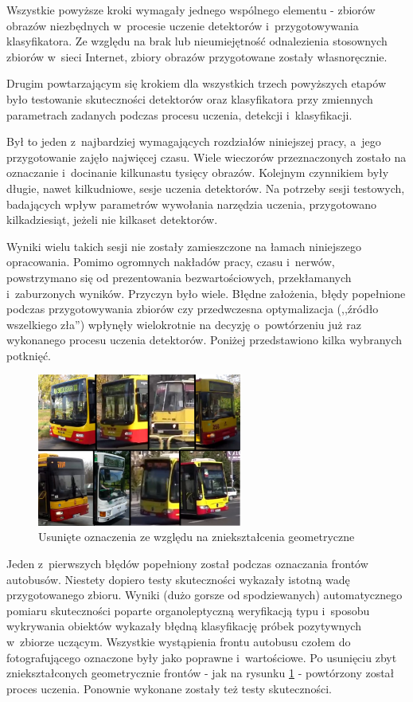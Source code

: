 Wszystkie powyższe kroki wymagały jednego wspólnego elementu - zbiorów obrazów
niezbędnych w~procesie uczenie detektorów i~przygotowywania klasyfikatora.
Ze względu na brak lub nieumiejętność odnalezienia stosownych zbiorów
w~sieci Internet, zbiory obrazów przygotowane zostały własnoręcznie.

Drugim powtarzającym się krokiem dla wszystkich trzech powyższych etapów było
testowanie skuteczności detektorów oraz klasyfikatora przy zmiennych
parametrach zadanych podczas procesu uczenia, detekcji i~klasyfikacji.

Był to jeden z~najbardziej wymagających rozdziałów niniejszej pracy, a~jego
przygotowanie zajęło najwięcej czasu. Wiele wieczorów przeznaczonych zostało 
na oznaczanie i~docinanie kilkunastu tysięcy obrazów. Kolejnym czynnikiem były długie,
nawet kilkudniowe, sesje uczenia detektorów. Na potrzeby sesji testowych,
badających wpływ parametrów wywołania narzędzia uczenia, przygotowano
kilkadziesiąt, jeżeli nie kilkaset detektorów.

Wyniki wielu takich sesji nie zostały zamieszczone na łamach niniejszego opracowania.
Pomimo ogromnych nakładów pracy, czasu i~nerwów, powstrzymano się
od prezentowania bezwartościowych, przekłamanych i~zaburzonych wyników.
Przyczyn było wiele.
Błędne założenia, błędy popełnione podczas przygotowywania zbiorów czy 
przedwczesna optymalizacja (,,źródło wszelkiego zła'') wpłynęły wielokrotnie
na decyzję o~powtórzeniu już raz wykonanego procesu uczenia detektorów.
Poniżej przedstawiono kilka wybranych 
potknięć.

\begin{figure}[h!]
	\centering
	\includegraphics[width=0.6\textwidth]{img/exp_removed_distorted_fronts}
	\caption{Usunięte oznaczenia ze względu na zniekształcenia geometryczne}
	\label{fig:deformation_samples}
\end{figure}

Jeden z~pierwszych błędów popełniony został podczas oznaczania
frontów autobusów. Niestety dopiero testy skuteczności wykazały
istotną wadę przygotowanego zbioru. Wyniki (dużo gorsze od spodziewanych)
automatycznego pomiaru skuteczności poparte organoleptyczną weryfikacją 
typu i~sposobu wykrywania obiektów wykazały błędną klasyfikację próbek pozytywnych
w~zbiorze uczącym. Wszystkie wystąpienia frontu autobusu czołem do fotografującego
oznaczone były jako poprawne i~wartościowe. Po usunięciu zbyt
zniekształconych geometrycznie frontów - jak na rysunku \ref{fig:deformation_samples} -
powtórzony został proces uczenia. Ponownie wykonane zostały też testy skuteczności.

